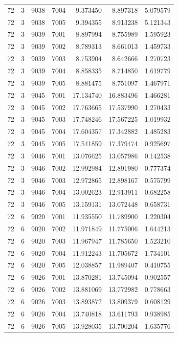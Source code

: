 \begin{table}
\begin{tabular}{rrrrrrr}
72 & 3 & 9038 & 7004 & 9.373450 & 8.897318 & 5.079579 \\
72 & 3 & 9038 & 7005 & 9.394355 & 8.913238 & 5.121343 \\
72 & 3 & 9039 & 7001 & 8.897994 & 8.755989 & 1.595923 \\
72 & 3 & 9039 & 7002 & 8.789313 & 8.661013 & 1.459733 \\
72 & 3 & 9039 & 7003 & 8.753904 & 8.642666 & 1.270723 \\
72 & 3 & 9039 & 7004 & 8.858335 & 8.714850 & 1.619779 \\
72 & 3 & 9039 & 7005 & 8.881475 & 8.751097 & 1.467971 \\
72 & 3 & 9045 & 7001 & 17.134740 & 16.883496 & 1.466281 \\
72 & 3 & 9045 & 7002 & 17.763665 & 17.537990 & 1.270433 \\
72 & 3 & 9045 & 7003 & 17.748246 & 17.567225 & 1.019932 \\
72 & 3 & 9045 & 7004 & 17.604357 & 17.342882 & 1.485283 \\
72 & 3 & 9045 & 7005 & 17.541859 & 17.379474 & 0.925697 \\
72 & 3 & 9046 & 7001 & 13.076625 & 13.057986 & 0.142538 \\
72 & 3 & 9046 & 7002 & 12.992984 & 12.891980 & 0.777374 \\
72 & 3 & 9046 & 7003 & 12.972865 & 12.898167 & 0.575799 \\
72 & 3 & 9046 & 7004 & 13.002623 & 12.913911 & 0.682258 \\
72 & 3 & 9046 & 7005 & 13.159131 & 13.072448 & 0.658731 \\
72 & 6 & 9020 & 7001 & 11.935550 & 11.789900 & 1.220304 \\
72 & 6 & 9020 & 7002 & 11.971849 & 11.775006 & 1.644213 \\
72 & 6 & 9020 & 7003 & 11.967947 & 11.785650 & 1.523210 \\
72 & 6 & 9020 & 7004 & 11.912243 & 11.705672 & 1.734101 \\
72 & 6 & 9020 & 7005 & 12.038857 & 11.989407 & 0.410755 \\
72 & 6 & 9026 & 7001 & 13.870281 & 13.745094 & 0.902557 \\
72 & 6 & 9026 & 7002 & 13.881069 & 13.772982 & 0.778663 \\
72 & 6 & 9026 & 7003 & 13.893872 & 13.809379 & 0.608129 \\
72 & 6 & 9026 & 7004 & 13.740818 & 13.611793 & 0.938985 \\
72 & 6 & 9026 & 7005 & 13.928035 & 13.700204 & 1.635776 \\

\end{tabular}
\end{table}
